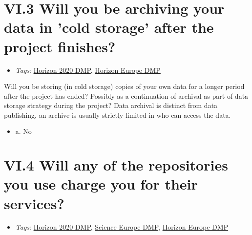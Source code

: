 \documentclass[a4paper,12pt]{report}
\begin{document}
\section*{\protect\textcolor{colorSecId}{VI.3} Will you be archiving your data in 'cold storage' after the project finishes?}

\label{d5b27482-b598-4b8c-b534-417d4ad27394.f9d84278-b61d-4314-94e9-12644bfa1d00}


\begin{itemize}
  \item \textit{Tags}: \ul{Horizon 2020 DMP}, \ul{Horizon Europe DMP}
  \end{itemize}


\noindent
\begin{markdown}
Will you be storing (in cold storage) copies of your own data for a longer period after the project has ended? Possibly as a continuation of archival as part of data storage strategy during the project? Data archival is distinct from data publishing, an archive is usually strictly limited in who can access the data.
\end{markdown}



\begin{itemize}
  \item[\CheckmarkBold] a. No
\end{itemize}






\section*{\protect\textcolor{colorSecId}{VI.4} Will any of the repositories you use charge you for their services?}

\label{d5b27482-b598-4b8c-b534-417d4ad27394.de23bb94-b727-4907-9a5d-6f8c78c3e432}


\begin{itemize}
  \item \textit{Tags}: \ul{Horizon 2020 DMP}, \ul{Science Europe DMP}, \ul{Horizon Europe DMP}
  \end{itemize}
\end{document}
